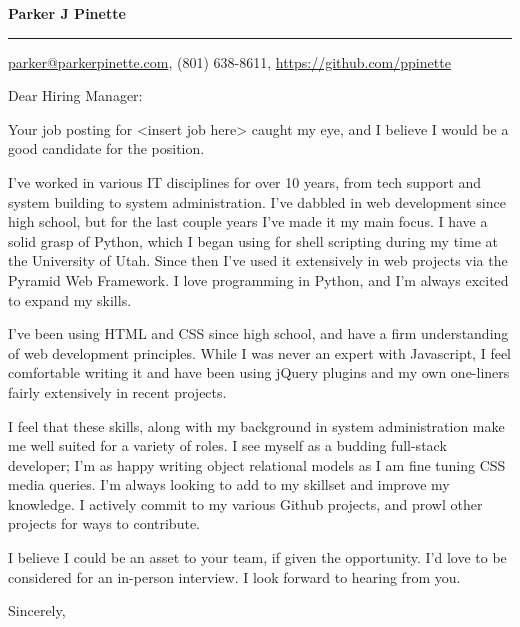 \documentclass{letter}
\begin{document}
\signature{Parker J Pinette}
\longindentation=8pt
\let\raggedleft\raggedright
\headsep=20pt

\begin{letter}{}

\begin{flushleft}
 {\large\bf Parker J Pinette}
\end{flushleft}
\medskip\hrule height 1pt
\begin{flushright}
 \hfill \href{mailto:parker@parkerpinette.com}{parker@parkerpinette.com}, (801) 638-8611, \url{https://github.com/ppinette} 
\end{flushright}
\vfill

\opening{Dear Hiring Manager:}

\noindent Your job posting for <insert job here> caught my eye, and I believe I would be a good candidate for the position.  

\noindent I've worked in various IT disciplines for over 10 years, from tech support and system building to system administration. I've dabbled in web development since high school, but for the last couple years I've made it my main focus. I have a solid grasp of Python, which I began using for shell scripting during my time at the University of Utah. Since then I've used it extensively in web projects via the Pyramid Web Framework. I love programming in Python, and I'm always excited to expand my skills. 

\noindent I've been using HTML and CSS since high school, and have a firm understanding of web development principles. While I was never an expert with Javascript, I feel comfortable writing it and have been using jQuery plugins and my own one-liners fairly extensively in recent projects. 

\noindent I feel that these skills, along with my background in system administration make me well suited for a variety of roles. I see myself as a budding full-stack developer; I'm as happy writing object relational models as I am fine tuning CSS media queries. I'm always looking to add to my skillset and improve my knowledge. I actively commit to my various Github projects, and prowl other projects for ways to contribute.

\noindent I believe I could be an asset to your team, if given the opportunity. I'd love to be considered for an in-person interview. I look forward to hearing from you.

\closing{Sincerely,}
\end{letter}
\end{document}
